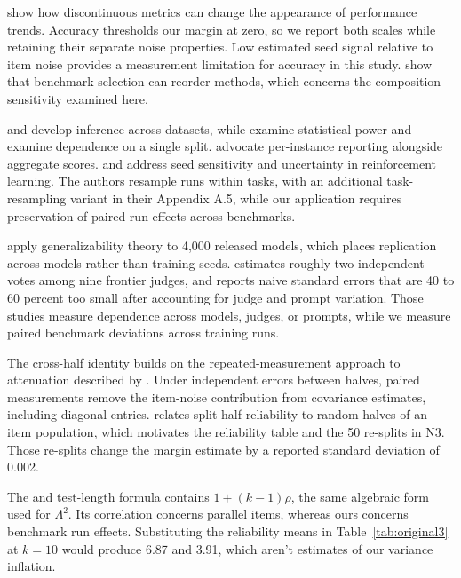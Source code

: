 \citet{schaeffer2023} show how discontinuous metrics can change the appearance of performance trends. Accuracy thresholds our margin at zero, so we report both scales while retaining their separate noise properties. Low estimated seed signal relative to item noise provides a measurement limitation for accuracy in this study. \citet{dehghani2021} show that benchmark selection can reorder methods, which concerns the composition sensitivity examined here.

\citet{demsar2006} and \citet{dror2017} develop inference across datasets, while \citet{card2020} examine statistical power and \citet{gorman2019} examine dependence on a single split. \citet{burnell2023} advocate per-instance reporting alongside aggregate scores. \citet{henderson2018} and \citet{agarwal2021} address seed sensitivity and uncertainty in reinforcement learning. The authors resample runs within tasks, with an additional task-resampling variant in their Appendix A.5, while our application requires preservation of paired run effects across benchmarks.

\citet{hardy2026} apply generalizability theory to 4,000 released models, which places replication across models rather than training seeds. \citet{kohli2026} estimates roughly two independent votes among nine frontier judges, and \citet{messing2026} reports naive standard errors that are 40 to 60 percent too small after accounting for judge and prompt variation. Those studies measure dependence across models, judges, or prompts, while we measure paired benchmark deviations across training runs.

The cross-half identity builds on the repeated-measurement approach to attenuation described by \citet{spearman1904}. Under independent errors between halves, paired measurements remove the item-noise contribution from covariance estimates, including diagonal entries. \citet{cronbach1951} relates split-half reliability to random halves of an item population, which motivates the reliability table and the 50 re-splits in N3. Those re-splits change the margin estimate by a reported standard deviation of 0.002.

The \citet{brown1910} and \citet{spearman1910} test-length formula contains $1+(k-1)\rho$, the same algebraic form used for $\Lambda^2$. Its correlation concerns parallel items, whereas ours concerns benchmark run effects. Substituting the reliability means in Table~\ref{tab:original3} at $k=10$ would produce 6.87 and 3.91, which aren't estimates of our variance inflation.

